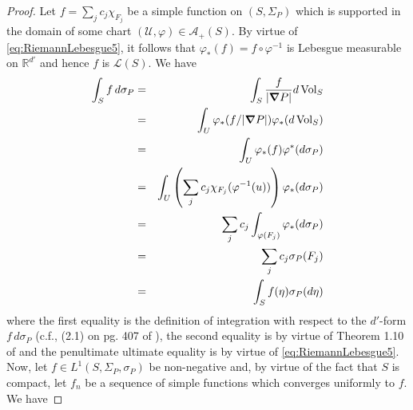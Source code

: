 \documentclass[11pt]{article}
\newcommand{\Vol}{\operatorname{Vol}}
\begin{document}
\begin{proof}
Let $f=\sum_{j}c_j\chi_{F_j}$ be a simple function on $(S,\Sigma_P)$ which is supported in the domain of some chart $(\mathcal{U},\varphi)\in\mathcal{A}_+(S)$. By virtue of \eqref{eq:RiemannLebesgue5}, it follows that $\varphi_*(f)=f\circ\varphi^{-1}$ is Lebesgue measurable on $\mathbb{R}^{d'}$ and hence $f$ is $\mathcal{L}(S)$. We have
\begin{eqnarray*}
    \int_S f\,d\sigma_P&=&\int_S \frac{f}{|\grad P|}d\Vol_S\\
    &=&\int_U \varphi_*(f/\abs{\grad P})\varphi_*(d\Vol_S)\\
    &=&\int_U\varphi_*(f)\varphi^*(d\sigma_P)\\
    &=&\int_U\left(\sum_j c_j\chi_{F_j}(\varphi^{-1}(u))\right)\varphi_*(d\sigma_P)\\
    &=&\sum_jc_j\int_{\varphi(F_j)}\varphi_*(d\sigma_P)\\
    &=&\sum_jc_j\sigma_P(F_j)\\
    &=&\int_S f(\eta)\sigma_P(d\eta)
\end{eqnarray*}
where the first equality is the definition of integration with respect to the $d'$-form $f\,d\sigma_P$ (c.f., (2.1) on pg. 407 of \cite{Amann2009}), the second equality is by virtue of Theorem 1.10 of \cite{Amann2009} and the penultimate ultimate equality is by virtue of \eqref{eq:RiemannLebesgue5}. Now, let $f\in L^1(S,\Sigma_P,\sigma_P)$ be non-negative and, by virtue of the fact that $S$ is compact, let $f_n$ be a sequence of simple functions which converges uniformly to $f$. We have 


\end{proof}
\end{document}
